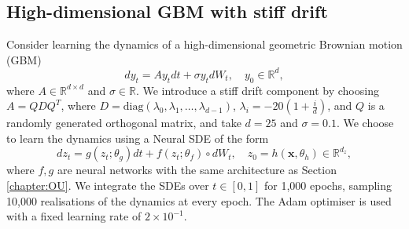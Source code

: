 \documentclass{article} %
\theoremstyle{definition}
\theoremstyle{remark}
\begin{document}

\subsection{High-dimensional GBM with stiff drift}

Consider learning the dynamics of a high-dimensional geometric Brownian motion (GBM)
\begin{equation*}
    dy_t = A y_t dt + \sigma y_t dW_t, \quad y_0 \in \mathbb{R}^d,
\end{equation*}
where $A \in \mathbb{R}^{d \times d}$ and $\sigma \in \mathbb{R}$. We introduce a stiff drift component by choosing $A = QDQ^T$, where $D = \text{diag}(\lambda_0, \lambda_1, \ldots, \lambda_{d-1})$, $\lambda_i = -20(1 + \frac{i}{d})$, and $Q$ is a randomly generated orthogonal matrix, and take $d = 25$ and $\sigma = 0.1$. We choose to learn the dynamics using a Neural SDE of the form
\begin{equation*}
    dz_t = g(z_t; \theta_g) dt + f(z_t; \theta_f) \circ dW_t, \quad z_0 = h(\mathbf{x}, \theta_h) \in \mathbb{R}^{d_z},
\end{equation*}
where $f,g$ are neural networks with the same architecture as Section \ref{chapter:OU}. We integrate the SDEs over $t \in [0,1]$ for 1,000 epochs, sampling 10,000 realisations of the dynamics at every epoch. The Adam optimiser is used with a fixed learning rate of $2\times 10^{-1}$.\par\smallskip
\end{document}
